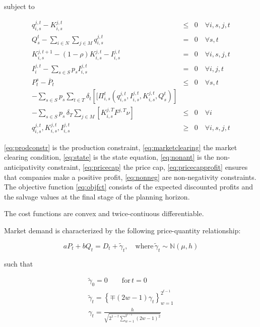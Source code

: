 subject to
  
\begin{eqnarray}  
q_{i,s}^{j,t} - K_{i,s}^{j,t} &\leq& 0 \quad \forall i,s,j,t \label{eq:prodconstr} \\
Q_s^t-\sum_{i\in N}\sum_{j\in M} q_{i,s}^{j,t} &=& 0 \quad \forall s,t \label{eq:marketclearing}\\
K_{i,s}^{j,t+1} - (1-\rho)K_{i,s}^{j,t}-I_{i,s}^{j,t} &=& 0 \quad \forall i,s,j,t \label{eq:state} \\
I_{i}^{j,t}-\sum_{s\in S}p_sI_{i,s}^{j,t} &=& 0 \quad \forall i,j,t \label{eq:nonant}\\
P_t^s - \overline{P}_t &\leq& 0 \quad \forall s,t \label{eq:pricecap}\\
-\sum_{s\in S}p_s \sum_{t\in T}\delta_t\left[[\Pi_{i,s}^t\left(q_{i,s}^{j,t}, I_{i,s}^{j,t}, K_{i,s}^{j,t}, Q_s^t\right)\right]\nonumber\\
  -\sum_{s\in S}p_s\,\delta_T \sum_{j\in M}\left[K_{i,s}^{j,T}F^{j,T}\nu\right] &\leq& 0 \quad \forall i \label{eq:pricecapprofit}\\
q_{i,s}^{j,t}, K_{i,s}^{j,t}, I_{i,s}^{j,t}  &\geq& 0 \quad \forall i,s,j,t\label{eq:nonneg}
\end{eqnarray}

\eqref{eq:prodconstr} is the production constraint, \eqref{eq:marketclearing} the market clearing condition, \eqref{eq:state} is the state equation, \eqref{eq:nonant} is the non-anticipativity constraint, \eqref{eq:pricecap} the price cap, \eqref{eq:pricecapprofit} ensures that companies make a positive profit, \eqref{eq:nonneg} are non-negativity constraints. The objective function \eqref{eq:objfct} consists of the expected discounted profits and the salvage values at the final stage of the planning horizon.

The cost functions are convex and twice-contiuous differentiable.

Market demand is characterized by the following price-quantity relationship:

\begin{equation}
  \label{eq:marketdemandpq}
  aP_t+bQ_t=D_t+\tilde{\gamma}_t, \quad \mbox{where}\, \tilde{\gamma}_t\sim\mathbb{N}(\mu,h)
\end{equation}

such that

\begin{eqnarray*}
  \label{eq:3}
  \tilde{\gamma}_0=0\qquad\mbox{for}\, t=0\\
   \tilde{\gamma}_t=\left\{\mp(2w-1)\gamma_t\right\}_{w=1}^{2^{t-1}}\\
   \gamma_t=\frac{h}{\sqrt{2^{1-t}\sum_{w=1}^{2^{t-1}}(2w-1)^2}}
\end{eqnarray*}


